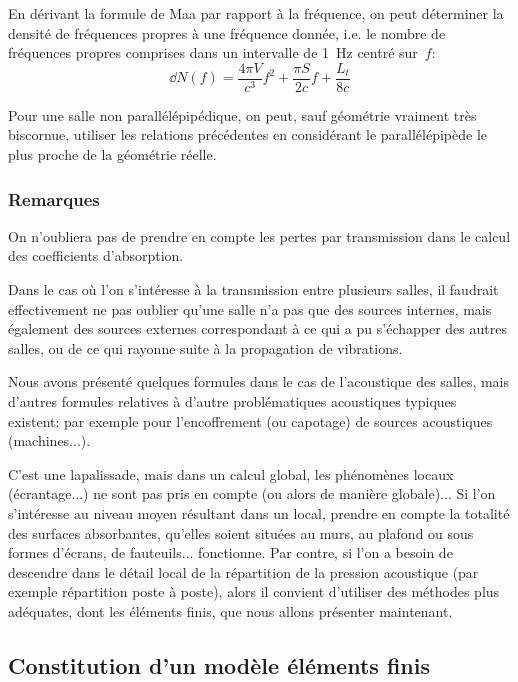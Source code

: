 En dérivant la formule de Maa par rapport à la fréquence, on peut déterminer la
densité de fréquences propres à une fréquence donnée, i.e. le nombre de fréquences propres comprises dans un intervalle de 1~Hz centré sur~$f$:
\begin{equation}
\dd N(f) = \frac{4\pi V}{c^3}f^2 + \frac{\pi S}{2c}f + \frac{L_t}{8c}
\end{equation}

Pour une salle non parallélépipédique, on peut, sauf géométrie vraiment très biscornue, utiliser les relations précédentes en considérant le parallélépipède le plus proche de la géométrie réelle.

\medskip
\subsubsection{Remarques}

On n'oubliera pas de prendre en compte les pertes par transmission dans le calcul des coefficients d'absorption.

\medskip
Dans le cas où l'on s'intéresse à la transmission entre plusieurs salles, il faudrait effectivement ne pas oublier qu'une salle n'a pas que des sources internes, mais également des sources externes correspondant à ce qui a pu s'échapper des autres salles, ou de ce qui rayonne suite à la propagation de vibrations.

\medskip
Nous avons présenté quelques formules dans le cas de l'acoustique des salles, mais d'autres formules relatives à d'autre problématiques acoustiques typiques existent: par exemple pour l'encoffrement (ou capotage) de sources acoustiques (machines...).

\medskip
C'est une lapalissade, mais dans un calcul global, les phénomènes locaux (écrantage...) ne sont pas pris en compte (ou alors de manière globale)...
Si l'on s'intéresse au niveau moyen résultant dans un local, prendre en compte la totalité des surfaces absorbantes, qu'elles soient situées au murs, au plafond ou sous formes d'écrans, de fauteuils... fonctionne.
Par contre, si l'on a besoin de descendre dans le détail local de la répartition de la pression acoustique (par exemple répartition poste à poste), alors il convient d'utiliser des méthodes plus adéquates, dont les éléments finis, que nous allons présenter maintenant.

\medskip
\subsection{Constitution d'un modèle éléments finis}


